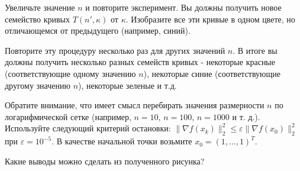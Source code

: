 \documentclass[
  russian,
  letterpaper,
  DIV=11,
  numbers=noendperiod]{scrartcl}
\begin{document}
Увеличьте значение \(n\) и повторите эксперимент. Вы должны получить
новое семейство кривых \(T(n',\kappa)\) от \(\kappa\). Изобразите все
эти кривые в одном цвете, но отличающемся от предыдущего (например,
синий).

Повторите эту процедуру несколько раз для других значений \(n\). В итоге
вы должны получить несколько разных семейств кривых - некоторые красные
(соответствующие одному значению \(n\)), некоторые синие
(соответствующие другому значению \(n\)), некоторые зеленые и т.д.

Обратите внимание, что имеет смысл перебирать значения размерности \(n\)
по логарифмической сетке (например, \(n = 10\), \(n = 100\),
\(n = 1000\) и т. д.). Используйте следующий критерий остановки:
\(\|\nabla f(x_k)\|_2^2 \leq \varepsilon \|\nabla f(x_0)\|_2^2\) при
\(\varepsilon = 10^{-5}\). В качестве начальной точки возьмите
\(x_0 = (1, \ldots, 1)^T\).

Какие выводы можно сделать из полученного рисунка?
\end{document}
